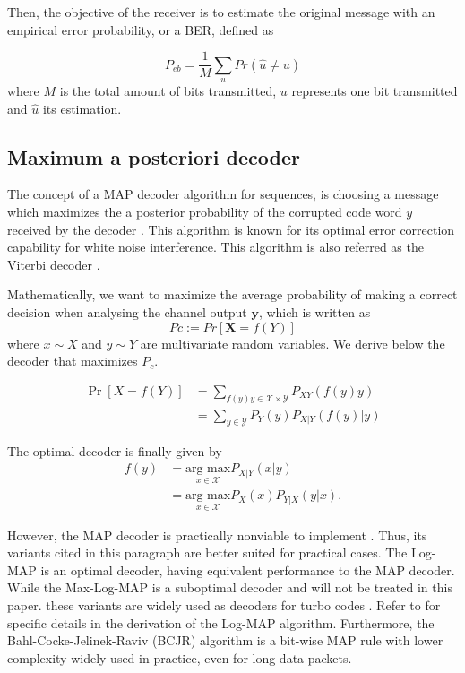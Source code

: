 \documentclass[conference]{IEEEtran}
\begin{document}
Then, the objective of the receiver is to estimate the original message with an empirical error probability, or a BER, defined as

\begin{equation}
P_{eb} = \frac{1}{M} \underset{u}{\sum}Pr(\hat{u}\neq u)
\end{equation}
where $M$ is the total amount of bits transmitted, $u$ represents one bit transmitted and $\hat{u}$ its estimation.



\subsection{Maximum a posteriori decoder}


The concept of a MAP decoder algorithm for sequences, is choosing a message which maximizes the a posterior probability of the corrupted code word $y$ received by the decoder \cite{b4}. This algorithm is known for its optimal error correction capability for white noise interference. This algorithm is also referred as the Viterbi decoder \cite{viterbi}.

Mathematically, we want to maximize the average probability of making a correct decision when analysing the channel output $\textbf{y}$, which is written as
\begin{equation}\label{eq:MAP1}
Pc := Pr[\textbf{X}=f({Y})]
\end{equation}
where $x \sim X$ and $y \sim Y$ are multivariate random variables. We derive below the decoder that maximizes $P_c$.

\begin{align} 
\Pr \left[ X=f\left( Y\right) \right]& =\sum_{f\left( y\right) y\in \mathcal{X}\times \mathcal{Y}} P_{XY}(f(y)y) \label{eq:MAP2} \\
&=\sum _{y\in \mathcal{Y}}P_{Y}\left( y\right)P_{X|Y}\left( f(y)|y\right) \label{eq:MAP3}
\end{align}

The optimal decoder is finally given by
\begin{align}
f(y) &= \underset{x\in \mathcal{X}}{\text{arg max}} P_{X|Y}(x|y)\label{eq:MAPF1}\\
&= \underset{x\in \mathcal{X}}{\text{arg max}}
P_X(x)P_{Y|X}(y|x).\label{eq:MAPF2}
\end{align}

However, the MAP decoder is practically nonviable to implement \cite{b6}. Thus, its variants cited in this paragraph are better suited for practical cases. The Log-MAP is an optimal decoder, having equivalent performance to the MAP decoder. While the Max-Log-MAP is a suboptimal decoder and will not be treated in this paper.  these variants are widely used as decoders for turbo codes \cite{b7}. Refer to \cite{b6} for specific details in the derivation of the Log-MAP algorithm. Furthermore, the Bahl-Cocke-Jelinek-Raviv (BCJR) algorithm is a bit-wise MAP rule with lower complexity widely used in practice, even for long data packets.
\end{document}
